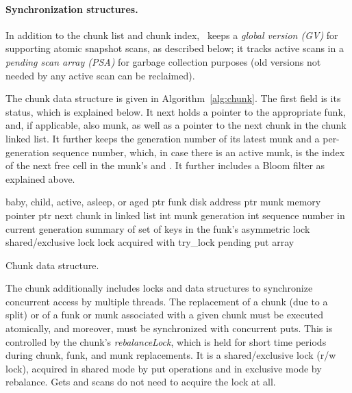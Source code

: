 \paragraph{Synchronization structures.}

In addition to the chunk list and chunk index, \sys\ keeps a \emph{global version (GV)} for supporting atomic snapshot scans,
as described below; it tracks active scans in a \emph{pending scan array (PSA)} for garbage collection purposes (old 
versions not needed by any active scan can be reclaimed).

The chunk data structure is given in Algorithm~\ref{alg:chunk}. 
The first field is its status, which is explained  below. 
It next holds a pointer to the appropriate funk, and, if applicable, also munk, as well as a pointer to the next 
chunk in the chunk linked list.
It further keeps the generation number of its latest munk and a per-generation sequence number,
which, in case there is an active munk, is the index of the next free cell in the munk's    and .
It further includes a Bloom filter as explained above.

\begin{algorithm}[htb]

\begin{algorithmic}
\State {} \Comment  baby, child, active, asleep, or aged
\State ptr  \Comment funk disk address
\State ptr  \Comment munk memory pointer
\State ptr  \Comment next chunk in linked list
\State int  \Comment munk generation
\State int  \Comment sequence number in current generation 
\State {} \Comment summary of set of keys in the funk's 
\State asymmetric lock  \Comment shared/exclusive lock 
\State lock  \Comment acquired with try\_lock 
\State {} \Comment pending put array
\end{algorithmic}

\caption{Chunk data structure.}
\label{alg:chunk}
\end{algorithm}


The chunk additionally includes locks and data structures to synchronize concurrent access by multiple threads.
The replacement of a chunk (due to a split) or of a funk or munk associated with a given chunk 
must be executed atomically, and moreover, must be synchronized with concurrent puts. 
This is controlled by the chunk's \emph{rebalanceLock}, which is held for short time periods
during chunk, funk, and munk replacements.  It is a shared/exclusive lock (r/w lock), acquired in shared mode 
by put operations and in exclusive mode by rebalance. Gets and scans do not need to acquire the lock at all.

